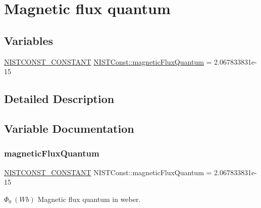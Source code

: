 \hypertarget{group___n_i_s_t_const-_magnetic_flux_quantum}{}\section{Magnetic flux quantum}
\label{group___n_i_s_t_const-_magnetic_flux_quantum}
\subsection*{Variables}
\begin{DoxyCompactItemize}
\item 
\mbox{\hyperlink{_n_i_s_t_const_8hpp_a2b0fc1d7452373f816175dd86ce26729}{N\+I\+S\+T\+C\+O\+N\+S\+T\+\_\+\+C\+O\+N\+S\+T\+A\+NT}} \mbox{\hyperlink{group___n_i_s_t_const-_magnetic_flux_quantum_gade84700a3e9c0f4759560353e2da4dde}{N\+I\+S\+T\+Const\+::magnetic\+Flux\+Quantum}} = 2.\+067833831e-\/15
\end{DoxyCompactItemize}


\subsection{Detailed Description}


\subsection{Variable Documentation}
\mbox{\label{group___n_i_s_t_const-_magnetic_flux_quantum_gade84700a3e9c0f4759560353e2da4dde}} 
\subsubsection{\texorpdfstring{magnetic\+Flux\+Quantum}{magneticFluxQuantum}}
{\footnotesize\ttfamily \mbox{\hyperlink{_n_i_s_t_const_8hpp_a2b0fc1d7452373f816175dd86ce26729}{N\+I\+S\+T\+C\+O\+N\+S\+T\+\_\+\+C\+O\+N\+S\+T\+A\+NT}} N\+I\+S\+T\+Const\+::magnetic\+Flux\+Quantum = 2.\+067833831e-\/15}

$\Phi_0 \ (Wb)$ Magnetic flux quantum in weber. 